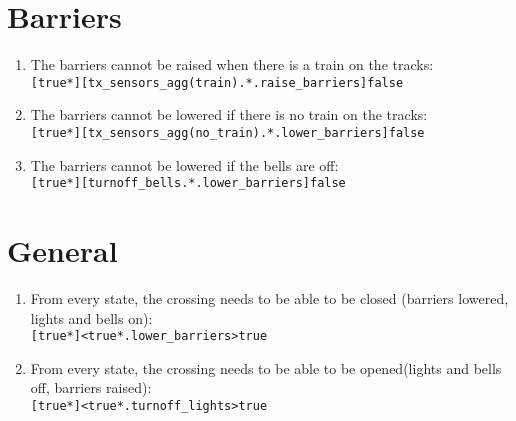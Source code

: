 \documentclass[final]{report}
\begin{document}
\section{Barriers}

\begin{enumerate}
    \item The barriers cannot be raised when there is a train on the tracks:\\
        \texttt{[true*][tx\_sensors\_agg(train).*.raise\_barriers]false}

    \item The barriers cannot be lowered if there is no train on the tracks:\\
        \texttt{[true*][tx\_sensors\_agg(no\_train).*.lower\_barriers]false}

    \item The barriers cannot be lowered if the bells are off:\\
        \texttt{[true*][turnoff\_bells.*.lower\_barriers]false}
\end{enumerate}


\section{General}

\begin{enumerate}
    \item From every state, the crossing needs to be able to be closed (barriers lowered, lights and bells on):\\
        \texttt{[true*]<true*.lower\_barriers>true}

    \item From every state, the crossing needs to be able to be opened(lights and bells off, barriers raised):\\
        \texttt{[true*]<true*.turnoff\_lights>true}
\end{enumerate}
\end{document}
